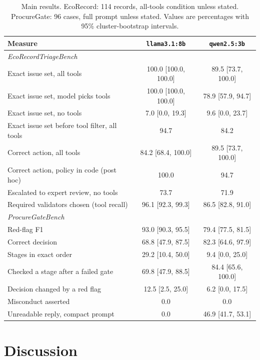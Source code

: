 \documentclass[11pt,a4paper]{article}
\newcommand{\code}[1]{\texttt{#1}}
\begin{document}
\begin{table}[t]
\centering
\small
\caption{Main results. EcoRecord: 114 records, all-tools condition unless stated. ProcureGate: 96 cases, full
prompt unless stated. Values are percentages with 95\% cluster-bootstrap intervals.}
\label{tab:main}
\begin{tabular}{lcc}
\toprule
Measure & \code{llama3.1:8b} & \code{qwen2.5:3b} \\
\midrule
\multicolumn{3}{l}{\emph{EcoRecordTriageBench}}\\
Exact issue set, all tools & 100.0 [100.0, 100.0] & 89.5 [73.7, 100.0] \\
Exact issue set, model picks tools & 100.0 [100.0, 100.0] & 78.9 [57.9, 94.7] \\
Exact issue set, no tools & 7.0 [0.0, 19.3] & 9.6 [0.0, 23.7] \\
Exact issue set before tool filter, all tools & 94.7 & 84.2 \\
Correct action, all tools & 84.2 [68.4, 100.0] & 89.5 [73.7, 100.0] \\
Correct action, policy in code (post hoc) & 100.0 & 94.7 \\
Escalated to expert review, no tools & 73.7 & 71.9 \\
Required validators chosen (tool recall) & 96.1 [92.3, 99.3] & 86.5 [82.8, 91.0] \\
\midrule
\multicolumn{3}{l}{\emph{ProcureGateBench}}\\
Red-flag F1 & 93.0 [90.3, 95.5] & 79.4 [77.5, 81.5] \\
Correct decision & 68.8 [47.9, 87.5] & 82.3 [64.6, 97.9] \\
Stages in exact order & 29.2 [10.4, 50.0] & 9.4 [0.0, 25.0] \\
Checked a stage after a failed gate & 69.8 [47.9, 88.5] & 84.4 [65.6, 100.0] \\
Decision changed by a red flag & 12.5 [2.5, 25.0] & 6.2 [0.0, 17.5] \\
Misconduct asserted & 0.0 & 0.0 \\
Unreadable reply, compact prompt & 0.0 & 46.9 [41.7, 53.1] \\
\bottomrule
\end{tabular}
\end{table}

\section{Discussion}
\end{document}
